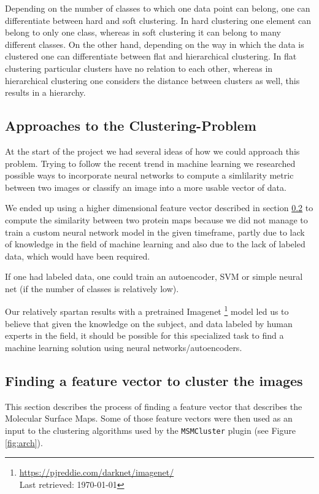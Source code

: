 \documentclass[journal]{vgtc}       %
\begin{document}
Depending on the number of classes to which one data point can belong, one can differentiate  between hard and soft clustering. In hard clustering one element can belong to only one class, whereas in soft clustering it can belong to many different classes.
On the other hand, depending on the way in which the data is clustered one can differentiate between flat and hierarchical clustering. In flat clustering particular clusters have no relation to each other, whereas in hierarchical clustering one considers the distance between clusters as well, this results in a hierarchy.


\subsection{Approaches to the Clustering-Problem}

At the start of the project we had several ideas of how we could approach this problem. 
Trying to follow the recent trend in machine learning we researched possible ways to incorporate neural networks to compute a simlilarity metric between  two images or classify an image into a more usable vector of data.

We ended up using a higher dimensional feature vector described in section \ref{sec:featurev} to  compute the similarity between two protein maps because we did not manage to train a custom neural network model in the given timeframe, partly due to lack of knowledge in the field of machine learning and also due to the lack of labeled data, which would have been required.

If one had labeled data, one could train an autoencoder, SVM or simple neural net (if the number of classes is relatively low).

Our relatively spartan results with a pretrained Imagenet \cite{imagenet}\footnote{\url{https://pjreddie.com/darknet/imagenet/} \\ Last retrieved: \today}  model led us to believe that given the knowledge on the subject, and  data labeled by human experts in the field, it should be possible for this specialized task to find a machine learning  solution using neural networks/autoencoders.

\subsection{Finding a feature vector to cluster the images}\label{sec:featurev}

This section describes the process of finding a feature vector that describes the  Molecular Surface Maps. Some of those feature vectors were then used as an input to the clustering algorithms used by the  \verb|MSMCluster| plugin (see  Figure \ref{fig:arch}).
\end{document}
